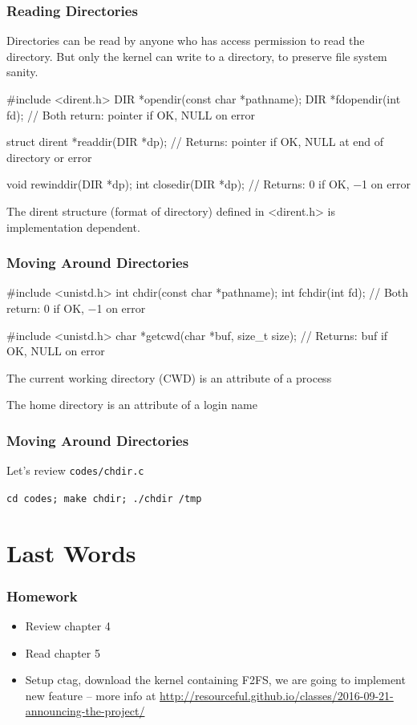 \documentclass[newPxFont,sthlmFooter,nooffset]{beamer}
\begin{document}
\begin{frame}[containsverbatim,t]
  \frametitle{Reading Directories}
Directories can be read by anyone who has access permission to read the directory. But only the kernel can write to a directory, to preserve file system sanity. 

\begin{codedef}
#include <dirent.h>
DIR *opendir(const char *pathname); 
DIR *fdopendir(int fd);
// Both return: pointer if OK, NULL on error 

struct dirent *readdir(DIR *dp); 
// Returns: pointer if OK, NULL at end of directory or error

void rewinddir(DIR *dp);
int closedir(DIR *dp);
// Returns: 0 if OK, −1 on error 
\end{codedef}


The dirent structure (format of directory) defined in <dirent.h> is implementation dependent.


\end{frame}



\begin{frame}[containsverbatim,t]
  \frametitle{Moving Around Directories}

\begin{codedef}
#include <unistd.h>
int chdir(const char *pathname); 
int fchdir(int fd);
// Both return: 0 if OK, −1 on error

#include <unistd.h>
char *getcwd(char *buf, size_t size);
// Returns: buf if OK, NULL on error
\end{codedef}

The current working directory (CWD) is an attribute of a process

The home directory is an attribute of a login name
\end{frame}



\begin{frame}[containsverbatim,t]
  \frametitle{Moving Around Directories}
Let's review \texttt{codes/chdir.c}

\bigskip

\texttt{cd codes; make chdir; ./chdir /tmp}


\end{frame}

\section{Last Words}
\begin{frame}[t]
  \frametitle{Homework}

  \begin{itemize}
  \item Review chapter 4
  \item Read chapter 5
  \item Setup ctag, download the kernel containing F2FS, we are going to implement new feature -- more info at \url{http://resourceful.github.io/classes/2016-09-21-announcing-the-project/}
  \end{itemize}
\end{frame}
\end{document}
